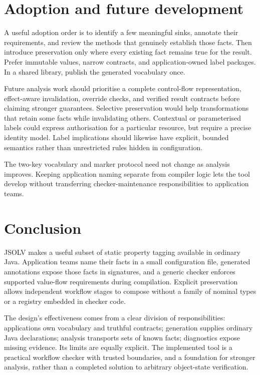 \documentclass[11pt]{article}
\newcommand{\jsolv}{\textsc{JSOLV}}
\begin{document}
\section{Adoption and future development}

A useful adoption order is to identify a few meaningful sinks, annotate their
requirements, and review the methods that genuinely establish those facts.
Then introduce preservation only where every existing fact remains true for
the result. Prefer immutable values, narrow contracts, and application-owned
label packages. In a shared library, publish the generated vocabulary once.

Future analysis work should prioritise a complete control-flow representation,
effect-aware invalidation, override checks, and verified result contracts before
claiming stronger guarantees. Selective preservation would help transformations
that retain some facts while invalidating others. Contextual or parameterised
labels could express authorisation for a particular resource, but require a
precise identity model. Label implications should likewise have explicit,
bounded semantics rather than unrestricted rules hidden in configuration.

The two-key vocabulary and marker protocol need not change as analysis improves.
Keeping application naming separate from compiler logic lets the tool develop
without transferring checker-maintenance responsibilities to application teams.

\section{Conclusion}

\jsolv{} makes a useful subset of static property tagging available in ordinary
Java. Application teams name their facts in a small configuration file, generated
annotations expose those facts in signatures, and a generic checker enforces
supported value-flow requirements during compilation. Explicit preservation
allows independent workflow stages to compose without a family of nominal
types or a registry embedded in checker code.

The design's effectiveness comes from a clear division of responsibilities:
applications own vocabulary and truthful contracts; generation supplies ordinary
Java declarations; analysis transports sets of known facts; diagnostics expose
missing evidence. Its limits are equally explicit. The implemented tool is a
practical workflow checker with trusted boundaries, and a foundation for stronger
analysis, rather than a completed solution to arbitrary object-state verification.
\end{document}
